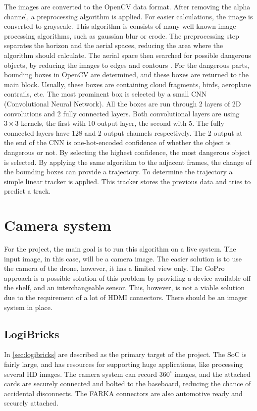 The images are converted to the OpenCV \cite{opencv_library} data format.
After removing the alpha channel, a preprocessing algorithm is applied.
For easier calculations, the image is converted to grayscale.
This algorithm is consists of many well-known image processing algorithms, such as gaussian blur or erode.
The preprocessing step separates the horizon and the aerial spaces, reducing the area where the algorithm should calculate.
The aerial space then searched for possible dangerous objects, by reducing the images to edges and contours \cite{31447} \cite{SUZUKI198532}.
For the dangerous parts, bounding boxes in OpenCV are determined, and these boxes are returned to the main block.
Usually, these boxes are containing cloud fragments, birds, aeroplane contrails, etc.
The most prominent box is selected by a small CNN (Convolutional Neural Network).
All the boxes are run through 2 layers of 2D convolutions and 2 fully connected layers.
Both convolutional layers are using $3\times 3$ kernels, the first with 10 output layer, the second with 5.
The fully connected layers have 128 and 2 output channels respectively.
The 2 output at the end of the CNN is one-hot-encoded confidence of whether the object is dangerous or not.
By selecting the highest confidence, the most dangerous object is selected.
By applying the same algorithm to the adjacent frames, the change of the bounding boxes can provide a trajectory.
To determine the trajectory a simple linear tracker is applied.
This tracker stores the previous data and tries to predict a track.

\section{Camera system} %
For the project, the main goal is to run this algorithm on a live system.
The input image, in this case, will be a camera image.
The easier solution is to use the camera of the drone, however, it has a limited view only.
The GoPro approach is a possible solution of this problem by providing a device available off the shelf, and an interchangeable sensor.
This, however, is not a viable solution due to the requirement of a lot of HDMI connectors.
There should be an imager system in place.

\subsection{LogiBricks} %
In \cref{sec:logibricks} are described as the primary target of the project.
The SoC is fairly large, and has resources for supporting huge applications, like processing several HD images.
The camera system can record $360^{\circ}$ images, and the attached cards are securely connected and bolted to the baseboard, reducing the chance of accidental disconnects.
The FARKA connectors are also automotive ready and securely attached.

